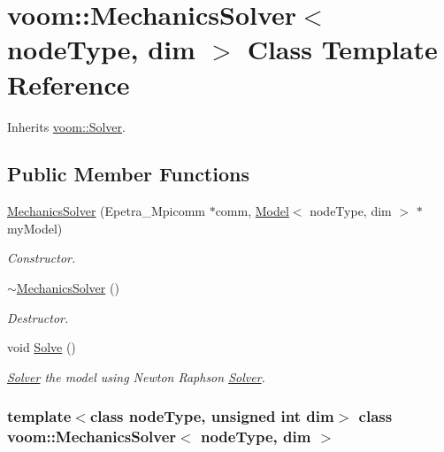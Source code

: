 \hypertarget{classvoom_1_1_mechanics_solver}{
\section{voom::MechanicsSolver$<$ nodeType, dim $>$ Class Template Reference}
\label{classvoom_1_1_mechanics_solver}
}


Inherits \hyperlink{classvoom_1_1_solver}{voom::Solver}.\subsection*{Public Member Functions}
\begin{DoxyCompactItemize}
\item 
\hyperlink{classvoom_1_1_mechanics_solver_a78c3e2a12949f5ac7c0c8977c8e2adc0}{MechanicsSolver} (Epetra\_\-Mpicomm $\ast$comm, \hyperlink{classvoom_1_1_model}{Model}$<$ nodeType, dim $>$ $\ast$myModel)
\begin{DoxyCompactList}\small\item\em Constructor. \item\end{DoxyCompactList}\item 
\hypertarget{classvoom_1_1_mechanics_solver_a9281e24c1f5db3df1f72bc82cc9a0795}{
\hyperlink{classvoom_1_1_mechanics_solver_a9281e24c1f5db3df1f72bc82cc9a0795}{$\sim$MechanicsSolver} ()}
\label{classvoom_1_1_mechanics_solver_a9281e24c1f5db3df1f72bc82cc9a0795}

\begin{DoxyCompactList}\small\item\em Destructor. \item\end{DoxyCompactList}\item 
\hypertarget{classvoom_1_1_mechanics_solver_ae2e76cd8dca609a2303bcd0783727a42}{
void \hyperlink{classvoom_1_1_mechanics_solver_ae2e76cd8dca609a2303bcd0783727a42}{Solve} ()}
\label{classvoom_1_1_mechanics_solver_ae2e76cd8dca609a2303bcd0783727a42}

\begin{DoxyCompactList}\small\item\em \hyperlink{classvoom_1_1_solver}{Solver} the model using Newton Raphson \hyperlink{classvoom_1_1_solver}{Solver}. \item\end{DoxyCompactList}\end{DoxyCompactItemize}
\subsubsection*{template$<$class nodeType, unsigned int dim$>$ class voom::MechanicsSolver$<$ nodeType, dim $>$}



